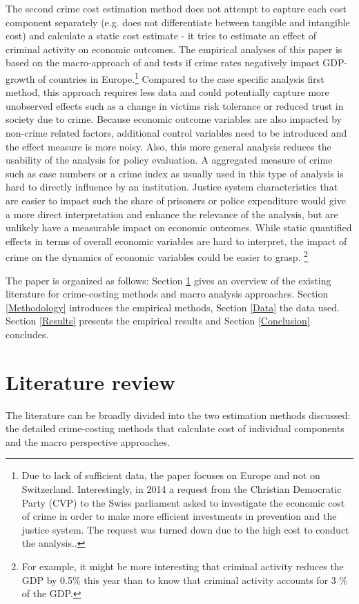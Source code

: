 \documentclass[a4paper,12pt]{article}
\begin{document}
The second crime cost estimation method does not attempt to capture each cost component separately (e.g. does not differentiate between tangible and intangible cost) and calculate a static cost estimate - it tries to estimate an effect of criminal activity on economic outcomes.
The empirical analyses of this paper is based on the macro-approach of \cite{entorf} and tests if crime rates negatively impact GDP-growth of countries in Europe.\footnote{Due to lack of sufficient data, the paper focuses on Europe and not on Switzerland.
Interestingly, in 2014 a request from the Christian Democratic Party (CVP) to the Swiss parliament asked to investigate the economic cost of crime in order to make more efficient investments in prevention and the justice system. The request was turned down due to the high cost to conduct the analysis.\citep{postulat}.}
Compared to the case specific analysis first method, this approach requires less data and could potentially capture more unobserved effects such as a change in victims risk tolerance or reduced trust in society due to crime.
Because economic outcome variables are also impacted by non-crime related factors, additional control variables need to be introduced and the effect measure is more noisy. 
Also, this more general analysis reduces the usability of the analysis for policy evaluation. A aggregated measure of crime such as case numbers or a crime index as usually used in this type of analysis is hard to directly influence by an institution. Justice system characteristics that are easier to impact such the share of prisoners or police expenditure would give a more direct interpretation and enhance the relevance of the analysis, but are unlikely have a measurable impact on economic outcomes. While static quantified effects in terms of overall economic variables are hard to interpret, the impact of crime on the dynamics of economic variables could be easier to grasp. \footnote{For example, it might be more interesting that criminal activity reduces the GDP by 0.5\% this year than to know that criminal activity accounts for 3 \% of the GDP.} 

The paper is organized as follows: Section \ref{Literature Review} gives an overview of the existing literature for crime-costing methods and macro analysis approaches. Section \ref{Methodology} introduces the empirical methods, Section \ref{Data} the data used. Section \ref{Results} presents the empirical results and Section \ref{Conclusion} concludes. 


\section{Literature review}
\label{Literature Review}
The literature can be broadly divided into the two estimation methods discussed: the detailed crime-costing methods that calculate cost of individual components and the macro perspective approaches. 
\end{document}
